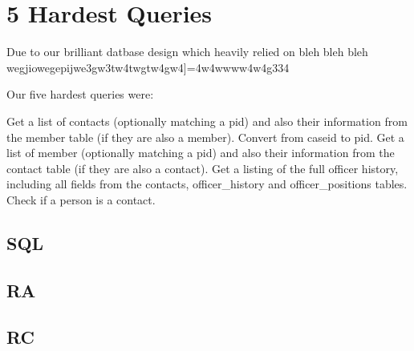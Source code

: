\documentclass{article}
\begin{document}
\section{5 Hardest Queries}

Due to our brilliant datbase design which heavily relied on bleh bleh bleh wegjiowegepijwe\we\qw3gw3tw\wg4twgtw4gw4]=\4\we\w4w4wwww4w4g334\g

Our five hardest queries were:\newline

Get a list of contacts (optionally matching a pid) and also their information from the member table (if they are also a member). \newline
Convert from caseid to pid. \newline
Get a list of member (optionally matching a pid) and also their information from the contact table (if they are also a contact). \newline
Get a listing of the full officer history, including all fields from the contacts, officer\_history and officer\_positions tables. \newline
Check if a person is a contact. \newline

\subsection{SQL}
\subsection{RA}
\subsection{RC}
\end{document}
